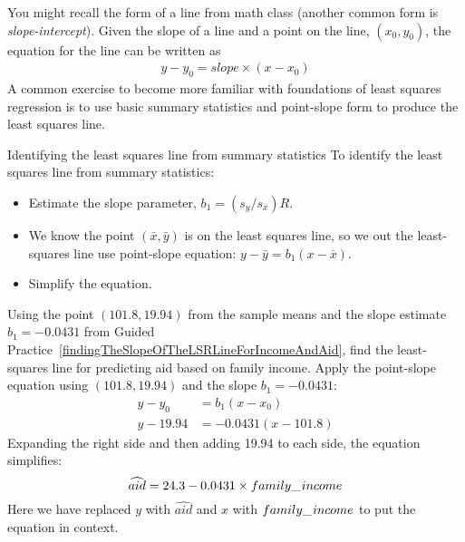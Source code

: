 You might recall the  form of a line from math class (another common form is \emph{slope-intercept}). Given the slope of a line and a point on the line, $(x_0, y_0)$, the equation for the line can be written as
\begin{eqnarray}
y - y_0 = slope\times (x - x_0)
\label{pointSlopeFormForALine}
\end{eqnarray}
A common exercise to become more familiar with foundations of least squares regression is to use basic summary statistics and point-slope form to produce the least squares line. 

\begin{onebox}{Identifying the least squares line from summary statistics}
To identify the least squares line from summary statistics:\vspace{-1mm}
\begin{itemize}
\setlength{\itemsep}{0mm}
\item Estimate the slope parameter, $b_1 = (s_y / s_x) R$.
\item We know the point $(\bar{x}, \bar{y})$ is on the least squares line, so we out the least-squares line use point-slope equation: $y - \bar{y} = b_1 (x - \bar{x})$.
\item Simplify the equation.
\end{itemize}
\end{onebox}

\begin{examplewrap}
\begin{nexample}{Using the point $(101.8, 19.94)$ from the sample means and the slope estimate $b_1 = -0.0431$ from Guided Practice~\ref{findingTheSlopeOfTheLSRLineForIncomeAndAid}, find the least-squares line for predicting aid based on family income.} \label{exampleToFindLSRLineOfElmhurstData}
Apply the point-slope equation using $(101.8, 19.94)$ and the slope $b_1 = -0.0431$:
\begin{align*}
y - y_0     &= b_1 (x - x_0) \\
y - 19.94  &= -0.0431(x - 101.8)
\end{align*}
Expanding the right side and then adding 19.94 to each side, the equation simplifies:
$$ \widehat{aid} = 24.3 - 0.0431 \times family\_\hspace{0.3mm}income $$
Here we have replaced $y$ with $\widehat{aid}$ and $x$ with $family\_\hspace{0.3mm}income$ to put the equation in context.
\end{nexample}
\end{examplewrap}

